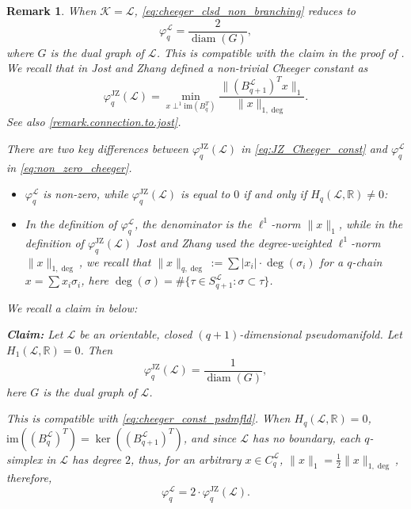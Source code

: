 \documentclass{article}
\newtheorem{remark}{Remark}[section]
\newcommand{\KK}{\mathcal{K}}
\newcommand{\LL}{\mathcal{L}}
\newcommand{\im}{\mathrm{im}}
\newcommand{\diam}{\operatorname{diam}}
\begin{document}
\begin{remark}
\label{rem.pseudo.jz}
When $\KK=\LL$,
\cref{eq:cheeger_clsd_non_branching} reduces to 
\begin{equation}\label{eq:cheeger_const_psdmfld}
\varphi_q^\LL=\frac{2}{\diam(G)},
\end{equation}
where $G$ is the dual graph of $\LL$.
This is compatible with the claim in the proof of \cite[Theorem 2.3]{jost2024cheeger}.
We recall that in \cite[Definition 2.3]{jost2024cheeger} Jost and Zhang defined a \emph{non-trivial} Cheeger constant as
\begin{equation}\label{eq:JZ_Cheeger_const}
\varphi_{q}^{\operatorname{JZ}}(\LL)=
\min_{x\perp^1\im(B_q^T)}\frac{\|(B_{q+1}^\LL)^Tx\|_1}{\|x\|_{1, \operatorname{deg}}}.
\end{equation}
See also \cref{remark.connection.to.jost}.

There are two key differences between $\varphi_{q}^{\operatorname{JZ}}(\LL)$ in \cref{eq:JZ_Cheeger_const} and $\varphi_{q}^\LL$ in \cref{eq:non_zero_cheeger}.
\begin{itemize}
\item $\varphi_q^\LL$ is non-zero,
while $\varphi_{q}^{\operatorname{JZ}}(\LL)$ is equal to $0$ if and only if $H_q(\LL, \mathbb{R})\neq 0$:
\item In the definition of $\varphi_q^\LL$,
the denominator is the $\ell^1$-norm $\|x\|_1$,
while in the definition of $\varphi_{q}^{\operatorname{JZ}}(\LL)$ Jost and Zhang used the degree-weighted $\ell^1$-norm $\|x\|_{1, \operatorname{deg}}$,
we recall that $\|x\|_{q, \operatorname{deg}}:=\sum |x_i|\cdot\deg(\sigma_i)$ for a $q$-chain $x=\sum x_i\sigma_i$,
here $\deg(\sigma)=\#\{\tau\in S_{q+1}^\LL: \sigma\subset \tau\}$.
\end{itemize}
We recall a claim in \cite{jost2024cheeger} below:

\noindent \textbf{Claim: } Let $\LL$ be an orientable, closed $(q+1)$-dimensional pseudomanifold.
Let $H_1(\LL, \mathbb{R})=0$.
Then 
\[\varphi_q^{\operatorname{JZ}}(\LL)=\frac{1}{\diam(G)},\]
here $G$ is the dual graph of $\LL$.

This is compatible with \cref{eq:cheeger_const_psdmfld}.
When $H_q(\LL, \mathbb{R})=0$,
$\im ((B_q^\LL)^T)=\ker((B_{q+1}^\LL)^T)$,
and since $\LL$ has no boundary,
each $q$-simplex in $\LL$ has degree $2$,
thus,
for an arbitrary $x\in C_q^\LL$,
$\|x\|_1=\frac{1}{2}\|x\|_{1, \deg}$,
therefore,
\[\varphi_q^\LL=2\cdot \varphi_q^{\operatorname{JZ}}(\LL).\]
\end{remark}
\end{document}
